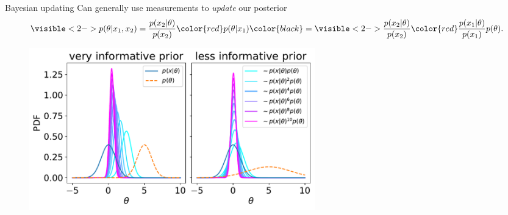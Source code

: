 \documentclass[
aspectratio=169,
14pt,
professionalfonts
]{beamer}
\begin{document}
\begin{frame}{Bayesian updating}
    \vspace{-0.5cm}
    Can generally use measurements to \textit{update} our posterior
    $$
    \visible<2->{
        p(\theta | x_1, x_2) 
        = \frac{p(x_2|\theta)}{p(x_2)}
    }
    \color{red} 
    p(\theta | x_1) 
    \color{black}
    = 
    \visible<2->{
        \frac{p(x_2|\theta)}{p(x_2)} 
    }
    \color{red} 
    \frac{p(x_1|\theta)}{p(x_1)} p(\theta).
    $$
    \begin{figure}
        \centering
        \includegraphics[width=0.6\textwidth]{../plots/updating.pdf}
    \end{figure}


\end{frame}
\end{document}

